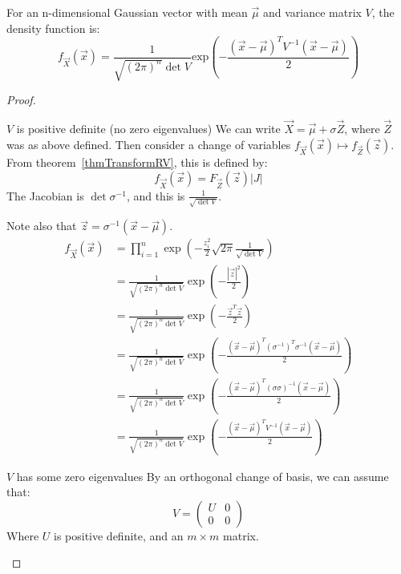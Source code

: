 \documentclass[../Main.tex]{subfiles}
\begin{document}
\begin{theorem}
    For an n-dimensional Gaussian vector with mean $\vec{\mu}$ and variance matrix $V$, the density function is:
    \begin{equation*}
        f_{\vec{X}}(\vec{x}) = \frac{1}{\sqrt{(2\pi)^n} \det{V}} \text{exp} \left(-\frac{(\vec{x} - \vec{\mu})^T V^{-1} (\vec{x} - \vec{\mu})}{2}\right)
    \end{equation*}
\end{theorem}
\begin{proof}
    \begin{case}{$V$ is positive definite (no zero eigenvalues)}
        We can write $\vec{X} = \vec{\mu} + \sigma \vec{Z}$, where $\vec{Z}$ was as above defined. Then consider a change of variables $f_{\vec{X}}(\vec{x}) \mapsto f_{\vec{Z}}(\vec{z})$. From theorem~\ref{thmTransformRV}, this is defined by:
        \begin{equation*}
            f_{\vec{X}}(\vec{x}) = F_{\vec{Z}}(\vec{z}) |J|
        \end{equation*}
        The Jacobian is $\det{\sigma^{-1}}$, and this is $\frac{1}{\sqrt{\det{V}}}$.

        Note also that $\vec{z} = \sigma^{-1} (\vec{x} - \vec{\mu})$.
        \begin{align*}
            f_{\vec{X}}(\vec{x}) &= \prod_{i=1}^{n} \exp\left({-\frac{z_i^2}{2}}{\sqrt{2\pi}} \frac{1}{\sqrt{\det{V}}}\right) \\
            &= \frac{1}{\sqrt{(2\pi)^n \det{V}}} \exp\left({-\frac{|\vec{z}|^2}{2}}\right) \\
            &= \frac{1}{\sqrt{(2\pi)^n \det{V}}} \exp\left({-\frac{\vec{z}^T \vec{z}}{2}}\right) \\
            &= \frac{1}{\sqrt{(2\pi)^n \det{V}}} \exp\left({-\frac{(\vec{x} - \vec{\mu})^T (\sigma^{-1})^T \sigma^{-1} (\vec{x} - \vec{\mu})}{2}}\right) \\
            &= \frac{1}{\sqrt{(2\pi)^n \det{V}}} \exp\left({-\frac{(\vec{x} - \vec{\mu})^T (\sigma \sigma)^{-1} (\vec{x} - \vec{\mu})}{2}}\right) \\
            &= \frac{1}{\sqrt{(2\pi)^n \det{V}}} \exp\left({-\frac{(\vec{x} - \vec{\mu})^T V^{-1} (\vec{x} - \vec{\mu})}{2}}\right)
        \end{align*}
    \end{case}
    \begin{case}{$V$ has some zero eigenvalues}
        By an orthogonal change of basis, we can assume that:
        \begin{equation*}
            V =
            \begin{pmatrix}
                U & 0 \\
                0 & 0
            \end{pmatrix}
        \end{equation*}
        Where $U$ is positive definite, and an $m \times m$ matrix.


\end{case}
\end{proof}
\end{document}
